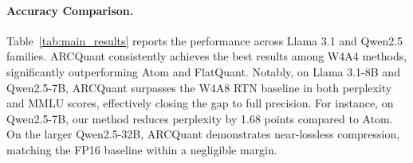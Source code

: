 \documentclass[11pt]{article}
\begin{document}






\paragraph{Accuracy Comparison.} Table~\ref{tab:main_results} reports the performance across Llama 3.1 and Qwen2.5 families. ARCQuant consistently achieves the best results among W4A4 methods, significantly outperforming Atom and FlatQuant. Notably, on Llama 3.1-8B and Qwen2.5-7B, ARCQuant surpasses the W4A8 RTN baseline in both perplexity and MMLU scores, effectively closing the gap to full precision. For instance, on Qwen2.5-7B, our method reduces perplexity by 1.68 points compared to Atom. On the larger Qwen2.5-32B, ARCQuant demonstrates near-lossless compression, matching the FP16 baseline within a negligible margin.
\end{document}
